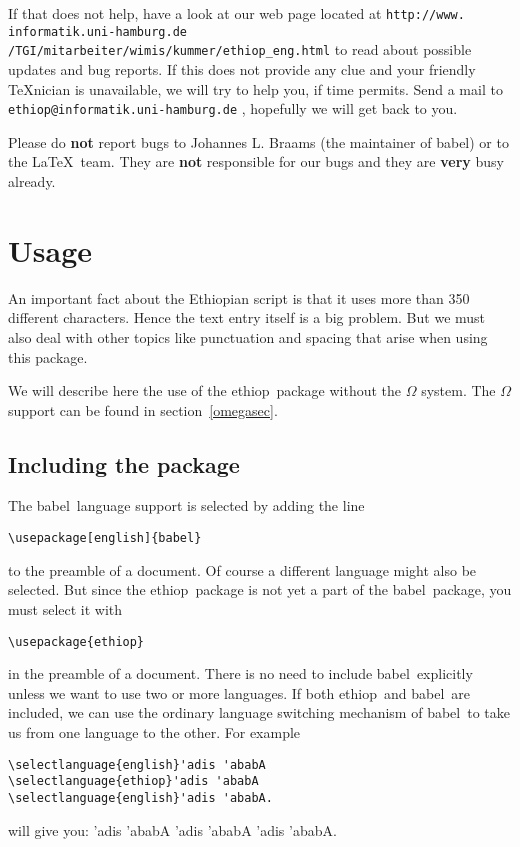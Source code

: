 \documentclass[a4paper]{article}
\makeatletter
\newcommand*\babel{\textsf{babel}}
\newcommand*\ethioplogo{\textsf{ethiop}}
\newcommand{\servicemail}{%
  \texttt{ethiop@informatik.uni-hamburg.de}%
}
\makeatother
\begin{document}
If that does not help, have a look at our web page located at
{\small\verb|http://www.|\discretionary{}{}{}%
       \verb|informatik.uni-hamburg.de|%
       \verb|/TGI/mitarbeiter/wimis/kummer/ethiop_eng.html|}%
\hspace{0,33333em plus 3em}%
to read about possible updates and bug reports. If this
does not provide any clue and your friendly \TeX nician is unavailable,
we will try to help you, if time permits. Send a mail to
\servicemail, hopefully we will get back to you.

Please do \textbf{not} report bugs to Johannes L. Braams (the
maintainer of \babel) or to the \LaTeX\ team. They are \textbf{not}
responsible for our bugs and they are \textbf{very} busy already.


\section{Usage}

An important fact about the Ethiopian script is that
it uses more than 350 different characters. Hence the text
entry itself is a big problem. But we must also deal with
other topics like punctuation and spacing that arise when
using this package.

We will describe here the use of the \ethioplogo\ package
without the $\Omega$ system. The $\Omega$ support can be found
in section~\ref{omegasec}.

\subsection{Including the package}

The \babel\ language support is selected by adding the line
\begin{verbatim}
\usepackage[english]{babel}
\end{verbatim}
to the preamble of a document. Of course a different language
might also be selected. But since the \ethioplogo\ package is not yet
a part of the \babel\ package, you must select it with
\begin{verbatim}
\usepackage{ethiop}
\end{verbatim}
in the preamble of a document. There is no need to include
\babel\ explicitly unless we want to use two or more languages.
If both \ethioplogo\ and \babel\ are included, we can use the ordinary
language switching mechanism of \babel\ to take us
from one language to the other. For example
\begin{verbatim}
\selectlanguage{english}'adis 'ababA
\selectlanguage{ethiop}'adis 'ababA
\selectlanguage{english}'adis 'ababA.
\end{verbatim}
will give you:
'adis 'ababA
'adis 'ababA
'adis 'ababA.
\end{document}
